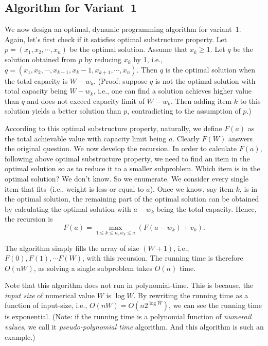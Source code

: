 \subsection*{Algorithm for Variant~1}

We now design an optimal, dynamic programming algorithm for variant~1.
Again, let's first check if it satisfies optimal substructure property.
Let $p = (x_1, x_2, \cdots, x_n)$ be the optimal solution.
Assume that $x_k \ge 1$. Let $q$ be the solution obtained from $p$ by
reducing $x_k$ by 1, i.e., $q = (x_1, x_2, \cdots, x_{k-1}, x_k - 1, x_{k + 1}, \cdots, x_n)$.
Then $q$ is the optimal solution when the total capacity is $W - w_k$.
(Proof: suppose $q$ is not the optimal solution with total capacity being $W - w_k$,
i.e., one can find a solution achieves higher value than $q$ and does not exceed capacity limit of $W - w_k$.
Then adding item-$k$ to this solution yields a better solution than $p$, contradicting to the assumption of $p$.)

According to this optimal substructure property, naturally,
we define $F(a)$ as the total achievable value with capacity limit being $a$.
Clearly $F(W)$ answers the original question.
We now develop the recursion.
In order to calculate $F(a)$, following above optimal substructure property,
we need to find an item in the optimal solution so as to reduce it to a smaller subproblem.
Which item is in the optimal solution? We don't know. So we enumerate.
We consider every single item that fits~(i.e., weight is less or equal to $a$).
Once we know, say item-$k$, is in the optimal solution, the remaining part of the optimal
solution can be obtained by calculating the optimal solution with $a - w_k$ being the total capacity.
Hence, the recursion is
$$F(a) = \textstyle \max_{1\le k \le n, w_k \le a} (F(a-w_k) + v_k).$$

The algorithm simply fills the array of size $(W + 1)$, i.e., $F(0), F(1), \cdots F(W)$,
with this recursion. The running time is therefore $O(nW)$, as solving
a single subproblem takes $O(n)$ time.

Note that this algorithm does not run in polynomial-time.
This is because, the \emph{input size} of numerical value $W$ is $\log W$.
By rewriting the running time as a function of input-size, i.e.,
$O(nW) = O(n2^{\log W})$, we can see the running time is exponential.
(Note: if the running time is a polynomial function of \emph{numerail values}, we call it
\emph{pseudo-polynomial time} algorithm. And this algorithm is such an example.)


